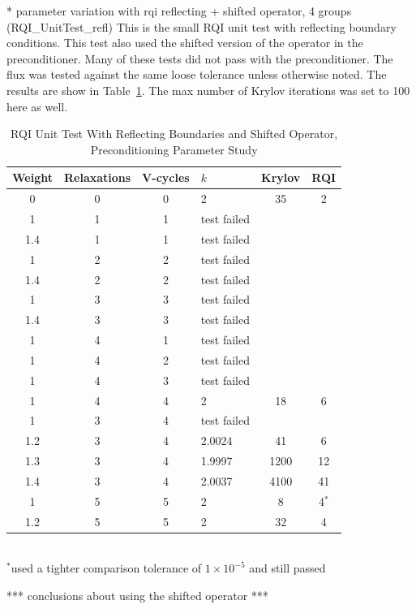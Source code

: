 * parameter variation with rqi reflecting + shifted operator, 4 groups (RQI\_UnitTest\_refl)
This is the small RQI unit test with reflecting boundary conditions. This test also used the shifted version of the operator in the preconditioner. Many of these tests did not pass with the preconditioner. The flux was tested against the same loose tolerance unless otherwise noted. The results are show in Table~\ref{table:RQIUnitTestReflShifted}. The max number of Krylov iterations was set to 100 here as well.
%
\begin{table}[!h]
\caption{RQI Unit Test With Reflecting Boundaries and Shifted Operator, Preconditioning Parameter Study}
\begin{center}
\begin{tabular}{c c c l c c}
\hline
Weight & Relaxations & V-cycles & $k$ & Krylov & RQI \\[0.5ex]
\hline
0    & 0 & 0 & 2 & 35 & 2 \\
1    & 1 & 1 & test failed \\
1.4 & 1 & 1 & test failed \\
1    & 2 & 2 & test failed \\
1.4 & 2 & 2 & test failed \\
1    & 3 & 3 & test failed \\
1.4 & 3 & 3 & test failed \\
1    & 4 & 1 & test failed \\
1    & 4 & 2 & test failed \\
1    & 4 & 3 & test failed \\
1    & 4 & 4 & 2 & 18 & 6 \\ 
1    & 3 & 4 & test failed \\
1.2 & 3 & 4 & 2.0024 & 41 & 6 \\
1.3 & 3 & 4 & 1.9997 & 1200 & 12 \\
1.4 & 3 & 4 & 2.0037 & 4100 & 41 \\
1    & 5 & 5 & 2 & 8 & 4$^{*}$ \\
1.2 & 5 & 5 & 2& 32 & 4 \\
\hline 
\end{tabular}\\
$^{*}$used a tighter comparison tolerance of $1 \times 10^{-5}$ and still passed
\end{center}
\label{table:RQIUnitTestReflShifted}
\end{table}

  *** conclusions about using the shifted operator ***
 
